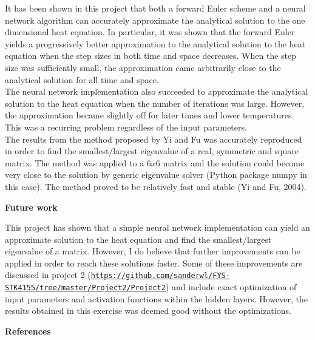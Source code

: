 \documentclass[12pt,a4paper]{article}
\begin{document}
\noindent It has been shown in this project that both a forward Euler scheme and a neural network algorithm can accurately approximate the analytical solution to the one dimensional heat equation. In particular, it was shown that the forward Euler yields a progressively better approximation to the analytical solution to the heat equation when the step sizes in both time and space decreases. When the step size was sufficiently small, the approximation came arbitrarily close to the analytical solution for all time and space.
\\
The neural network implementation also succeeded to approximate the analytical solution to the heat equation when the number of iterations was large. However, the approximation became slightly off for later times and lower temperatures. This was a recurring problem regardless of the input parameters.
\\
The results from the method proposed by Yi and Fu was accurately reproduced in order to find the smallest/largest eigenvalue of a real, symmetric and square matrix. The method was applied to a $6x6$ matrix and the solution could become very close to the solution by generic eigenvalue solver (Python package numpy in this case). The method proved to be relatively fast and stable (Yi and Fu, 2004).


\newpage

\begin{center}
\Large{\textbf{Future work}}
\end{center}

\noindent This project has shown that a simple neural network implementation can yield an approximate solution to the heat equation and find the smallest/largest eigenvalue of a matrix. However, I do believe that further improvements can be applied in order to reach these solutions faster. Some of these improvements are discussed in project 2 (\href{{https://github.com/sanderwl/FYS-STK4155/tree/master/Project2/Project2}}{\nolinkurl{https://github.com/sanderwl/FYS-STK4155/tree/master/Project2/Project2}}) and include exact optimization of input parameters and activation functions within the hidden layers. However, the results obtained in this exercise was deemed good without the optimizations.

\newpage

\begin{center}
\Large{\textbf{References}}
\end{center}
\end{document}
